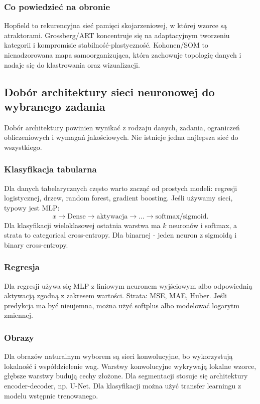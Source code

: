 \subsubsection{Co powiedzieć na obronie}

Hopfield to rekurencyjna sieć pamięci skojarzeniowej, w której wzorce są atraktorami. Grossberg/ART koncentruje się na adaptacyjnym tworzeniu kategorii i kompromisie stabilność-plastyczność. Kohonen/SOM to nienadzorowana mapa samoorganizująca, która zachowuje topologię danych i nadaje się do klastrowania oraz wizualizacji.

\subsection{Dobór architektury sieci neuronowej do wybranego zadania}

Dobór architektury powinien wynikać z rodzaju danych, zadania, ograniczeń obliczeniowych i wymagań jakościowych. Nie istnieje jedna najlepsza sieć do wszystkiego.

\subsubsection{Klasyfikacja tabularna}

Dla danych tabelarycznych często warto zacząć od prostych modeli: regresji logistycznej, drzew, random forest, gradient boosting. Jeśli używamy sieci, typowy jest MLP:
\[
x\to \text{Dense}\to \text{aktywacja}\to \dots \to \text{softmax/sigmoid}.
\]
Dla klasyfikacji wieloklasowej ostatnia warstwa ma $k$ neuronów i softmax, a strata to categorical cross-entropy. Dla binarnej - jeden neuron z sigmoidą i binary cross-entropy.

\subsubsection{Regresja}

Dla regresji używa się MLP z liniowym neuronem wyjściowym albo odpowiednią aktywacją zgodną z zakresem wartości. Strata: MSE, MAE, Huber. Jeśli predykcja ma być nieujemna, można użyć softplus albo modelować logarytm zmiennej.

\subsubsection{Obrazy}

Dla obrazów naturalnym wyborem są sieci konwolucyjne, bo wykorzystują lokalność i współdzielenie wag. Warstwy konwolucyjne wykrywają lokalne wzorce, głębsze warstwy budują cechy złożone. Dla segmentacji stosuje się architektury encoder-decoder, np. U-Net. Dla klasyfikacji można użyć transfer learningu z modelu wstępnie trenowanego.


